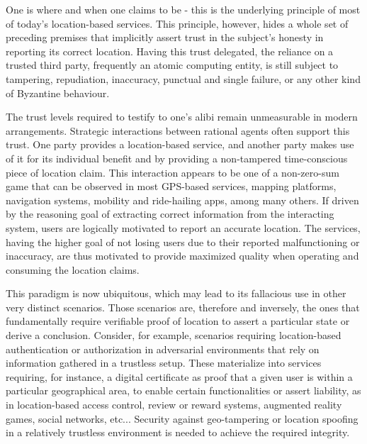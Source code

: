 
One is where and when one claims to be - this is the underlying principle of most of today's location-based services. This principle, however, hides a whole set of preceding premises that implicitly assert trust in the subject's honesty in reporting its correct location. Having this trust delegated, the reliance on a trusted third party, frequently an atomic computing entity, is still subject to tampering, repudiation, inaccuracy, punctual and single failure, or any other kind of Byzantine behaviour. 

The trust levels required to testify to one's alibi remain unmeasurable in modern arrangements. Strategic interactions between rational agents often support this trust. One party provides a location-based service, and another party makes use of it for its individual benefit and by providing a non-tampered time-conscious piece of location claim. This interaction appears to be one of a non-zero-sum game that can be observed in most GPS-based services, mapping platforms, navigation systems, mobility and ride-hailing apps, among many others. If driven by the reasoning goal of extracting correct information from the interacting system, users are logically motivated to report an accurate location. The services, having the higher goal of not losing users due to their reported malfunctioning or inaccuracy, are thus motivated to provide maximized quality when operating and consuming the location claims. 

This paradigm is now ubiquitous, which may lead to its fallacious use in other very distinct scenarios. Those scenarios are, therefore and inversely, the ones that fundamentally require verifiable proof of location to assert a particular state or derive a conclusion. Consider, for example, scenarios requiring location-based authentication or authorization in adversarial environments that rely on information gathered in a trustless setup. These materialize into services requiring, for instance, a digital certificate as proof that a given user is within a particular geographical area, to enable certain functionalities or assert liability, as in location-based access control, review or reward systems, augmented reality games, social networks, etc... Security against geo-tampering or location spoofing in a relatively trustless environment is needed to achieve the required integrity. 

